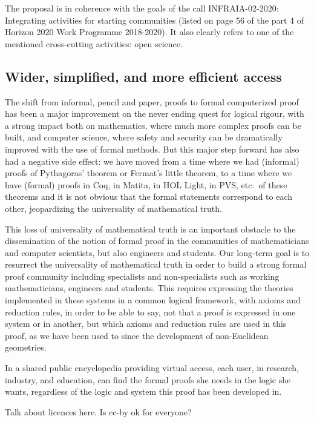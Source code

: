 The proposal is in coherence with the goals of the call INFRAIA-02-2020:
Integrating activities for starting communities (listed on page 56 of
the part 4 of Horizon 2020 Work Programme 2018-2020). It also clearly
refers to one of the mentioned cross-cutting activities: open science.

\subsection{Wider, simplified, and more efficient access}

The shift from informal, pencil and paper, proofs to formal
computerized proof has been a major improvement on the never ending
quest for logical rigour, with a strong impact both on mathematics,
where much more complex proofs can be built, and computer science,
where safety and security can be dramatically improved with the use of
formal methods.  But this major step forward has also had a negative side
effect: we have moved from a time where we had (informal) proofs of
Pythagoras' theorem or Fermat's little theorem, to a time where we
have (formal) proofs in {\sc Coq}, in {\sc Matita}, in {\sc HOL
  Light}, in {\sc PVS}, etc.\ of these theorems and it is not obvious
that the formal statements correspond to each other, jeopardizing the
universality of mathematical truth.

This loss of universality of mathematical truth is an important obstacle
to the dissemination of the notion of formal proof in the communities of
mathematicians and computer scientists, but also engineers and
students. Our long-term goal is to resurrect the universality of
mathematical truth in order to build a strong formal proof community
including specialists and non-specialists such as working
mathematicians, engineers and students.  This requires expressing the
theories implemented in these systems in a common logical framework,
with axioms and reduction rules, in order to be able to say, not that
a proof is expressed in one system or in another, but which axioms and
reduction rules are used in this proof, as we have been used to since
the development of non-Euclidean geometries.

In a shared public encyclopedia providing virtual access, each user,
in research, industry, and education, can find the formal proofs she
needs in the logic she wants, regardless of the logic and system this
proof has been developed in.

{\color{red} Talk about licences here. Is cc-by ok for everyone?}

